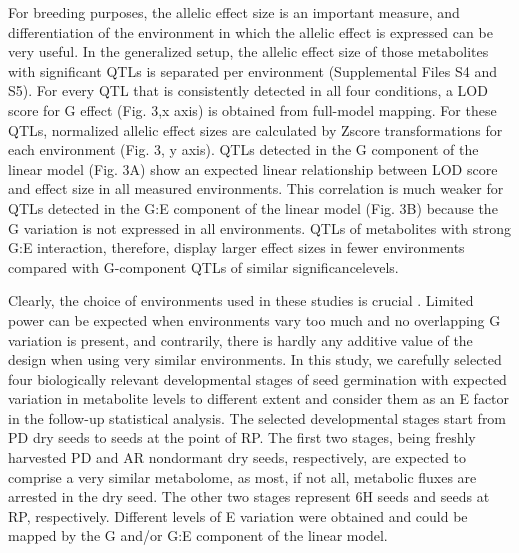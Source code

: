 For breeding purposes, the allelic effect size is an important measure, and differentiation of the 
environment in which the allelic effect is expressed can be very useful. In the generalized setup, 
the allelic effect size of those metabolites with significant QTLs is separated per environment 
(Supplemental Files S4 and S5). For every QTL that is consistently detected in all four conditions, 
a LOD score for G effect (Fig. 3,x axis) is obtained from full-model mapping. For these QTLs,
normalized allelic effect sizes are calculated by Zscore transformations for each environment 
(Fig. 3, y axis). QTLs detected in the G component of the linear model (Fig. 3A) show an expected 
linear relationship between LOD score and effect size in all measured environments. This correlation 
is much weaker for QTLs detected in the G:E component of the linear model (Fig. 3B) because the G 
variation is not expressed in all environments. QTLs of metabolites with strong G:E interaction, 
therefore, display larger effect sizes in fewer environments compared with G-component QTLs of 
similar significancelevels.

Clearly, the choice of environments used in these studies is crucial \cite{Li:2008}. Limited power 
can be expected when environments vary too much and no overlapping G variation is present, and 
contrarily, there is hardly any additive value of the design when using very similar environments. 
In this study, we carefully selected four biologically relevant developmental stages of seed germination 
with expected variation in metabolite levels to different extent and consider them as an E factor in 
the follow-up statistical analysis. The selected developmental stages start from PD dry seeds to 
seeds at the point of RP. The first two stages, being freshly harvested PD and AR nondormant dry 
seeds, respectively, are expected to comprise a very similar metabolome, as most, if not all, metabolic
fluxes are arrested in the dry seed. The other two stages represent 6H seeds and seeds at RP, respectively.
Different levels of E variation were obtained and could be mapped by the G and/or G:E component of 
the linear model.

